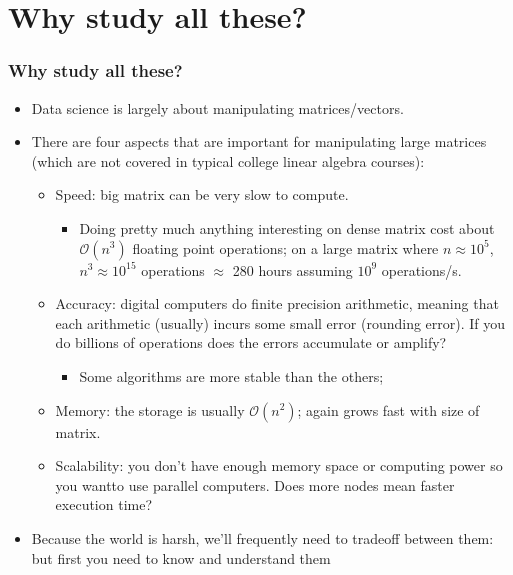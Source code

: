 \documentclass[10pt]{beamer}
\newcommand{\bigO}[1]{\mathcal{O}\left(#1\right)}
\begin{document}
\section{Why study all these?}
\begin{frame}
  \frametitle{Why study all these?}
  \begin{itemize}
    \item <2-> Data science is largely about manipulating matrices/vectors.
    \item <3-> There are four aspects that are important for manipulating large matrices (which are not covered in typical college linear algebra courses):
    \begin{itemize}
      \item <4-> \alert{Speed}: big matrix can be very slow to compute.
        \begin{itemize}
          \item <5-> Doing pretty much anything interesting on dense matrix cost about \(\bigO{n^3}\) floating point operations; on a large matrix where \(n \approx 10^5\), \(n^3 \approx 10^{15}\) operations \(\approx\) 280 hours assuming \(10^9\) operations/s.
        \end{itemize}
      \item <6-> \alert{Accuracy}: digital computers do finite precision arithmetic, meaning that each arithmetic (usually) incurs some small error (rounding error). If you do billions of operations does the errors accumulate or amplify?
        \begin{itemize}
          \item <7-> Some algorithms are more stable than the others;
        \end{itemize}
      \item <8-> \alert{Memory}: the storage is usually \(\bigO{n^2}\); again grows fast with size of matrix.
      \item <9-> \alert{Scalability}: you don’t have enough memory space or computing power so you wantto use parallel computers. Does more nodes mean faster execution time?
      \end{itemize}
    \item <10-> Because the world is harsh, we’ll frequently need to tradeoff between them: but first you need to know and understand them
  \end{itemize}
\end{frame}
\end{document}
